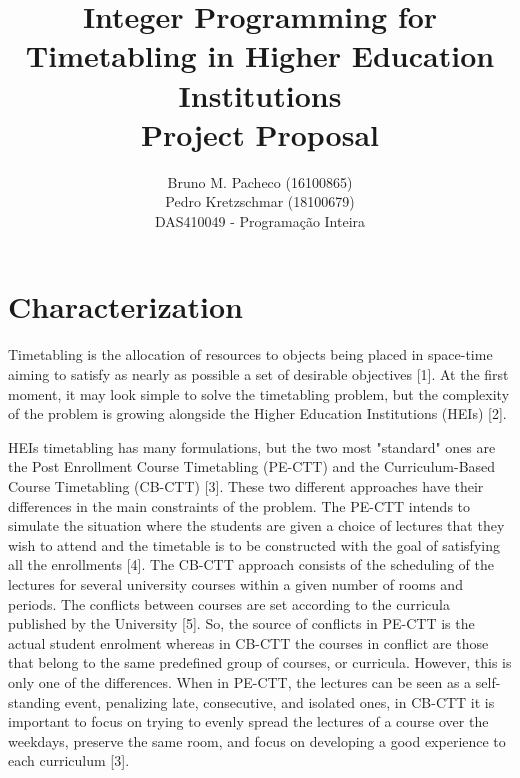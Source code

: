 \documentclass[a4paper]{report}
\begin{document}
 
\title{Integer Programming for Timetabling in Higher Education Institutions\\Project Proposal}
\author{Bruno M. Pacheco (16100865)\\
Pedro Kretzschmar (18100679) \\
DAS410049 - Programação Inteira}
 
\maketitle

\section*{Characterization}

Timetabling is the allocation of resources to objects being placed in space-time aiming to satisfy as nearly as possible a set of desirable objectives [1]. At the first moment, it may look simple to solve the timetabling problem, but the complexity of the problem is growing alongside the Higher Education Institutions (HEIs) [2].

HEIs timetabling has many formulations, but the two most "standard" ones are the Post Enrollment Course Timetabling (PE-CTT) and the Curriculum-Based Course Timetabling (CB-CTT) [3]. These two different approaches have their differences in the main constraints of the problem.
The PE-CTT intends to simulate the situation where the students are given a choice of lectures that they wish to attend and the timetable is to be constructed with the goal of satisfying all the enrollments [4].
The CB-CTT approach consists of the scheduling of the lectures for several university courses within a given number of rooms and periods. The conflicts between courses are set according to the curricula published by the University [5]. So, the source of conflicts in PE-CTT is the actual student enrolment whereas in CB-CTT the courses in conflict are those that belong to the same predefined group of courses, or curricula.
However, this is only one of the differences. When in PE-CTT, the lectures can be seen as a self-standing event, penalizing late, consecutive, and isolated ones, in CB-CTT it is important to focus on trying to evenly spread the lectures of a course over the weekdays, preserve the same room, and focus on developing a good experience to each curriculum [3].
\end{document}
